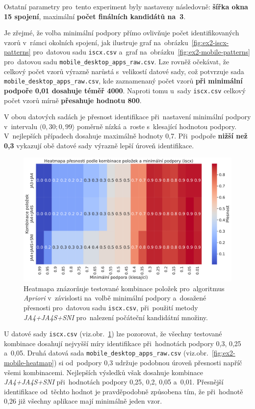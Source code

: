 Ostatní parametry pro~tento experiment byly nastaveny následovně: \textbf{šířka okna 15 spojení}, maximální \textbf{počet finálních kandidátů na~3}.

Je zřejmé, že volba minimální podpory přímo ovlivňuje počet identifikovaných vzorů v~rámci okolních spojení, jak ilustruje graf na~obrázku~\ref{fig:ex2-iscx-patterns} pro~datovou sadu \texttt{iscx.csv} a~graf na~obrázku~\ref{fig:ex2-mobile-patterns} pro~datovou sadu \texttt{mobile\_desktop\_apps\_raw.csv}. Lze rovněž očekávat, že celkový počet vzorů výrazně narůstá s~velikostí datové sady, což potvrzuje sada \texttt{mobile\_desktop\_apps\_raw.csv}, kde zaznamenaný počet vzorů \textbf{při minimální podpoře 0{,}01 dosahuje téměř 4000}. Naproti tomu u~sady \texttt{iscx.csv} celkový počet vzorů mírně \textbf{přesahuje hodnotu 800}.

V obou datových sadách je přesnost identifikace při~nastavení minimální podpory v~intervalu $(0{,}30; 0{,}99\rangle$ poměrně nízká a~roste s~klesající hodnotou podpory. V~nejlepších případech dosahuje maximálně hodnoty 0{,}7. Při~podpoře \textbf{nižší než 0{,}3} vykazují obě datové sady výrazně lepší úroveň identifikace.
\begin{figure}[H]
	\centering
	\includegraphics[width=\textwidth]{obrazky-figures/exps/ex2-iscx-heatmap.pdf}
	\caption{Heatmapa znázorňuje testované kombinace položek pro~algoritmus \textit{Apriori} v~závislosti na~volbě minimální podpory a~dosažené přesnosti pro~datovou sadu \texttt{iscx.csv}, při~použití metody \textit{JA4+JA4S+SNI} pro~nalezení počáteční kandidátní množiny.}
	\label{fig:ex2-iscx-heatmap}
\end{figure}
U datové sady \texttt{iscx.csv} (viz.obr.~\ref{fig:ex2-iscx-heatmap}) lze pozorovat, že všechny testované kombinace dosahují nejvyšší míry identifikace při~hodnotách podpory 0{,}3, 0{,}25 a~0{,}05. Druhá datová sada \texttt{mobile\_desktop\_apps\_raw.csv} (viz.obr.~\ref{fig:ex2-mobile-heatmap}) si od~podpory 0{,}3 udržuje podobnou úroveň přesnosti napříč všemi kombinacemi. Nejlepších výsledků však dosahuje kombinace \textit{JA4+JA4S+SNI} při~hodnotách podpory 0{,}25, 0{,}2, 0{,}05 a~0{,}01. Přesnější identifikace od~těchto hodnot je pravděpodobně způsobena tím, že při~hodnotě 0{,}26 již všechny aplikace mají minimálně jeden vzor.

